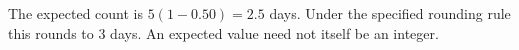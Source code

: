 The expected count is $5(1-0.50)=\boxed{2.5}$ days. Under the specified rounding rule this rounds to $\boxed3$ days. An expected value need not itself be an integer.
